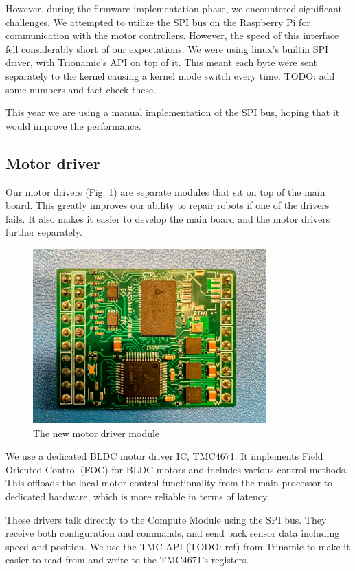 \documentclass[runningheads]{llncs}
\begin{document}
However, during the firmware implementation phase, we encountered significant challenges. We attempted to utilize the SPI bus on the Raspberry Pi for communication with the motor controllers. However, the speed of this interface fell considerably short of our expectations. We were using linux's builtin SPI driver, with Trionamic's API on top of it. This meant each byte were sent separately to the kernel causing a kernel mode switch every time. TODO: add some numbers and fact-check these.

This year we are using a manual implementation of the SPI bus, hoping that it would improve the performance.

\subsection{Motor driver}
Our motor drivers (Fig. \ref{fig:motor-driver}) are separate modules that sit on top of the main board. This greatly improves our ability to repair robots if one of the drivers fails. It also makes it easier to develop the main board and the motor drivers further separately.

\begin{figure}
	\centering
	\includegraphics[width=0.8\textwidth]{images/motor-driver.jpg}
	\caption{The new motor driver module}
	\label{fig:motor-driver}
\end{figure}

We use a dedicated BLDC motor driver IC, TMC4671. It implements Field Oriented Control (FOC) for BLDC motors and includes various control methods. This offloads the local motor control functionality from the main processor to dedicated hardware, which is more reliable in terms of latency.

These drivers talk directly to the Compute Module using the SPI bus. They receive both configuration and commands, and send back sensor data including speed and position. We use the TMC-API (TODO: ref) from Trinamic to make it easier to read from and write to the TMC4671's registers.
\end{document}
